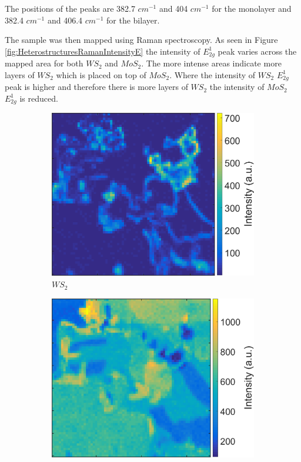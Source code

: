 The positions of the peaks are 382.7 $cm^{-1}$ and 404 $cm^{-1}$ for the monolayer and 382.4 $cm^{-1}$ and 406.4 $cm^{-1}$ for the bilayer.

The sample was then mapped using Raman spectroscopy. As seen in Figure \ref{fig:HeterostructuresRamanIntensityE} the intensity of $E^1_{2g}$ peak varies across the mapped area for both $WS_2$ and $MoS_2$. The more intense areas indicate more layers of $WS_2$ which is placed on top of $MoS_2$. Where the intensity of $WS_2$ $E^1_{2g}$ peak is higher and therefore there is more layers of $WS_2$ the intensity of $MoS_2$ $E^1_{2g}$ is reduced. 

\begin{figure}[h]
	\begin{center}
		\begin{subfigure}[b]{0.45\textwidth}
			\includegraphics[width=\textwidth]{Heterostructures/RamanIntensityMapEWS2.png}
			\caption{$WS_2$}
			\label{fig:HeterostructuresRamanIntensityEWS2}
		\end{subfigure}
		\begin{subfigure}[b]{0.45\textwidth}
			\includegraphics[width=\textwidth]{Heterostructures/RamanIntensityMapEMoS2.png}

\end{subfigure}
\end{center}
\end{figure}
